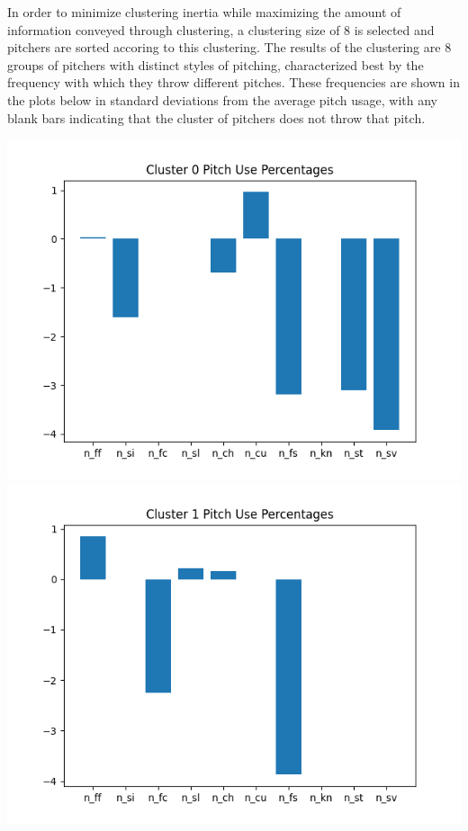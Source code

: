 \documentclass[12 pt]{article}
\begin{document}
\indent In order to minimize clustering inertia while maximizing the amount of information conveyed through 
clustering, a clustering size of 8 is selected and pitchers are sorted accoring to this 
clustering. The results of the clustering are 8 groups of pitchers with distinct 
styles of pitching, characterized best by the frequency with which they throw different pitches. 
These frequencies are shown in the plots below in standard deviations from the average pitch usage, with any 
blank bars indicating that the cluster of pitchers does not throw that pitch.
\begin{center}
 \includegraphics[scale=.425]{figs/pct0_8.png} \includegraphics[scale=.425]{figs/pct1_8.png}

\end{center}
\end{document}
